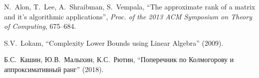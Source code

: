 \documentclass[handout]{beamer}
\begin{document}
\begin{frame}
    \begin{thebibliography}{XXXX}
            N.~Alon, T.~Lee, A.~Shraibman, S.~Vempala,
            ``The approximate rank of a matrix and it's algorithmic applications'',
            \textit{Proc. of the 2013 ACM Symposium on Theory of Computing}, 675--684.

         S.V.~Lokam, ``Complexity Lower Bounds using Linear
            Algebra'' (2009).

         Б.С.~Кашин, Ю.В.~Малыхин, К.С.~Рютин, ``Поперечник по
            Колмогорову и аппроксимативный ранг'' (2018).
    \end{thebibliography}
\end{frame}
\end{document}
